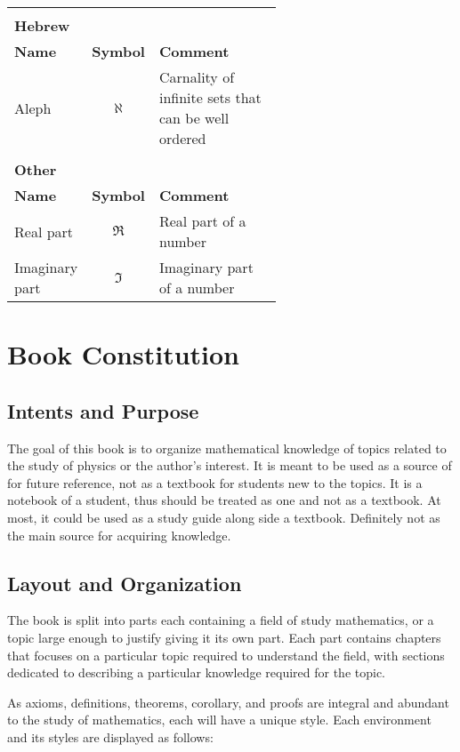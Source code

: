 \documentclass[12pt, english]{book}
\theoremstyle{break}
\theoremstyle{plain}
\begin{document}
\begin{tabularx}{\textwidth}{ l c p{0.6\linewidth}}
 		& & \\
 		\multicolumn{3}{l}{\textbf{{\large Hebrew}}} \\ [10pt]
 		\hline
 		\textbf{Name} & \textbf{Symbol} & \textbf{Comment} \\
 		\hline
 		Aleph					& $\aleph$			& Carnality of infinite sets that can be well ordered \\
 		\hline
 		
 		& & \\
 		\multicolumn{3}{l}{\textbf{{\large Other}}} \\ [10pt]
 		\hline
 		\textbf{Name} & \textbf{Symbol} & \textbf{Comment} \\
 		\hline
 		Real part 				& $\Re$				& Real part of a number \\
 		Imaginary part 			& $\Im$				& Imaginary part of a number \\
 		\hline
	\end{tabularx}

	\newpage
	\section*{Book Constitution}
	\subsection*{Intents and Purpose}
	The goal of this book is to organize mathematical knowledge of topics related to the study of physics or the author's interest. It is meant to be used as a source of for future reference, not as a textbook for students new to the topics. It is a notebook of a student, thus should be treated as one and not as a textbook. At most, it could be used as a study guide along side a textbook. Definitely not as the main source for acquiring knowledge. 
	
	\subsection*{Layout and Organization}
	The book is split into parts each containing a field of study mathematics, or a topic large enough to justify giving it its own part. Each part contains chapters that focuses on a particular topic required to understand the field, with sections dedicated to describing a particular knowledge required for the topic. 
	
	As axioms, definitions, theorems, corollary, and proofs are integral and abundant to the study of mathematics, each will have a unique style. Each environment and its styles are displayed as follows: 
	
\end{document}
